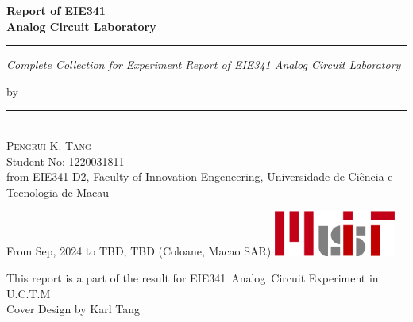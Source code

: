 \documentclass[a4paper,11pt]{article}
\begin{document}


\begin{titlepage}
    \ActivateWarningFilters[latex]

    \parbox{1\textwidth}{ %
		{\Huge\bfseries Report of EIE341 \\[0.15\baselineskip] 
            Analog Circuit Laboratory}\\[0.15\baselineskip] %
		\rule{1\textwidth}{1pt} %
        {\Large\textit{Complete Collection for Experiment Report of EIE341 Analog Circuit Laboratory}}
        \newline
    }
    \vspace{100pt} %
    \parbox{1\textwidth}{
        {\large by}\\[1.5\baselineskip]
        {\rule[1pt]{200pt}{1pt}} \\[1.25pt]
        {\huge\textsc{Pengrui K. Tang}
            }\\
        {\large{Student No: 1220031811}} \\
        \large from EIE341 D2, \newline
        Faculty of Innovation Engeneering, \newline
        Universidade de Ciência e Tecnologia de Macau
    }
		

    \vspace*{\fill}
		From Sep, 2024 to TBD, TBD \newline 
        (Coloane, Macao SAR)
        \vspace{0.7\baselineskip}\newline
        \includegraphics[width = 40mm]{../Header/MUIT_origin.png}\par
        {\small This report is a part of the result for}
        {\small EIE341~Analog~Circuit Experiment in U.C.T.M}\\[0.25pt]
        {\small Cover Design by Karl Tang}\\[0.25pt]

\end{titlepage}
\blankpage
\end{document}
